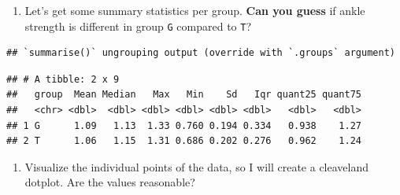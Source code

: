 \documentclass[
]{book}
\newenvironment{Shaded}{\begin{snugshade}}{\end{snugshade}}
\newcommand{\CommentTok}[1]{\textcolor[rgb]{0.56,0.35,0.01}{\textit{#1}}}
\newcommand{\DataTypeTok}[1]{\textcolor[rgb]{0.13,0.29,0.53}{#1}}
\newcommand{\FloatTok}[1]{\textcolor[rgb]{0.00,0.00,0.81}{#1}}
\newcommand{\KeywordTok}[1]{\textcolor[rgb]{0.13,0.29,0.53}{\textbf{#1}}}
\newcommand{\NormalTok}[1]{#1}
\newcommand{\OperatorTok}[1]{\textcolor[rgb]{0.81,0.36,0.00}{\textbf{#1}}}
\newcommand{\StringTok}[1]{\textcolor[rgb]{0.31,0.60,0.02}{#1}}
\providecommand{\tightlist}{%
  \setlength{\itemsep}{0pt}\setlength{\parskip}{0pt}}
\begin{document}
\begin{enumerate}
\def\labelenumi{\arabic{enumi}.}
\setcounter{enumi}{6}
\tightlist
\item
  Let's get some summary statistics per group. \textbf{Can you guess} if ankle strength is different in group \texttt{G} compared to \texttt{T}?
\end{enumerate}

\begin{Shaded}
\end{Shaded}

\begin{verbatim}
## `summarise()` ungrouping output (override with `.groups` argument)
\end{verbatim}

\begin{verbatim}
## # A tibble: 2 x 9
##   group  Mean Median   Max   Min    Sd   Iqr quant25 quant75
##   <chr> <dbl>  <dbl> <dbl> <dbl> <dbl> <dbl>   <dbl>   <dbl>
## 1 G      1.09   1.13  1.33 0.760 0.194 0.334   0.938    1.27
## 2 T      1.06   1.15  1.31 0.686 0.202 0.276   0.962    1.24
\end{verbatim}

\begin{enumerate}
\def\labelenumi{\arabic{enumi}.}
\setcounter{enumi}{6}
\tightlist
\item
  Visualize the individual points of the data, so I will create a cleaveland dotplot. Are the values reasonable?
\end{enumerate}
\end{document}
